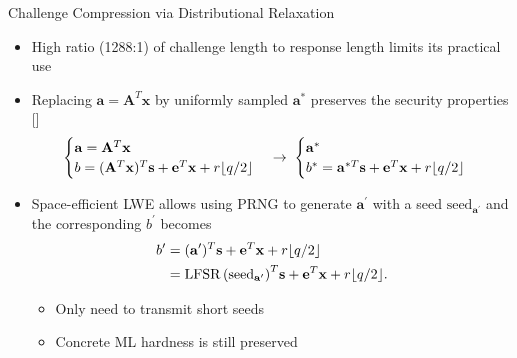 \begin{frame}{Challenge Compression via Distributional Relaxation}
\begin{itemize}
    \item  High ratio (1288:1) of challenge length to response length limits its practical use 
    \item Replacing $\mathbf{a}=\mathbf{A}^T\mathbf{x}$ by uniformly sampled $\mathbf{a}^*$ preserves the security properties []
 \begin{equation*}
    \begin{cases}
    \mathbf{a}= \mathbf{A}^T\mathbf{x}\\
    b = (\mathbf{A}^T\mathbf{x})^T\mathbf{s}+\mathbf{e}^T\mathbf{x}+r\lfloor q/2\rfloor
    \end{cases}\rightarrow\;
    \begin{cases}
    \mathbf{a}^*\\
    b^*=\mathbf{a}^{*T}\mathbf{s}+\mathbf{e}^T\mathbf{x}+r\lfloor q/2\rfloor
    \end{cases}
\end{equation*}   
\item Space-efficient LWE allows using PRNG to generate $\mathbf{a}^\prime$ with a seed $\text{seed}_{\mathbf{a}^\prime}$ and the corresponding $b^\prime$ becomes
\begin{align*}
    b^\prime&=(\mathbf{a}^\prime)^T\mathbf{s}+\mathbf{e}^T\mathbf{x}+r\floor{q/2}\\
    &= \LFSR{(\text{seed}_{\mathbf{a}^\prime})}^T\mathbf{s}+\mathbf{e}^T\mathbf{x}+r\floor{q/2}.
\end{align*}
    \begin{itemize}
        \item Only need to transmit short seeds
        \item Concrete ML hardness is still preserved
    \end{itemize}
\end{itemize}
\end{frame}

